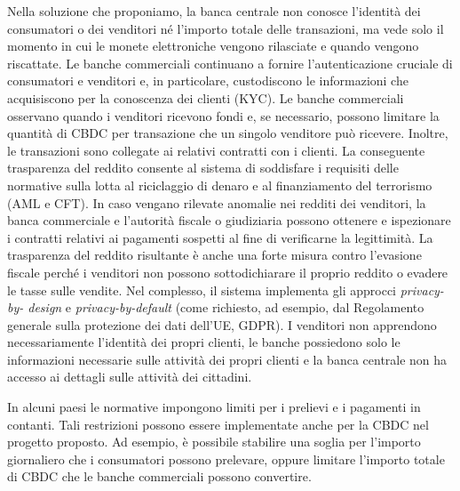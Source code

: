 \documentclass{article}
\begin{document}
Nella soluzione che proponiamo, la banca centrale non conosce
l'identità dei consumatori o dei venditori né l'importo totale delle
transazioni, ma vede solo il momento in cui le monete elettroniche vengono
rilasciate e quando vengono riscattate. Le banche commerciali continuano a
fornire l'autenticazione cruciale di consumatori e venditori e, in particolare,
custodiscono le informazioni che acquisiscono per la conoscenza dei clienti
(KYC). Le banche commerciali osservano quando i venditori ricevono fondi e, se
necessario, possono limitare la quantità di CBDC per transazione che
un singolo venditore può ricevere. Inoltre, le transazioni sono
collegate ai relativi contratti con i clienti. La conseguente
trasparenza del reddito  consente al sistema di soddisfare i requisiti
delle normative sulla lotta al riciclaggio di denaro e al
finanziamento del terrorismo (AML e CFT). In caso vengano rilevate
anomalie nei redditi dei venditori, la banca commerciale e
l'autorità fiscale o giudiziaria possono ottenere e ispezionare i
contratti relativi ai pagamenti sospetti al fine di verificarne la
legittimità. La trasparenza del reddito risultante è anche una forte
misura contro l'evasione fiscale perché i venditori non possono
sottodichiarare il proprio reddito o evadere le tasse sulle vendite.
Nel complesso, il sistema implementa gli approcci \textit{privacy-by-
design} e \textit{privacy-by-default} (come richiesto, ad esempio,
dal Regolamento generale sulla protezione dei dati dell'UE, GDPR). I
venditori non apprendono necessariamente l'identità dei propri clienti,
le banche possiedono solo le informazioni necessarie sulle attività dei
propri clienti e la banca centrale non ha accesso ai dettagli sulle
attività dei cittadini.

In alcuni paesi le normative impongono limiti per i prelievi e i
pagamenti in contanti. Tali restrizioni possono essere implementate
anche per la CBDC nel progetto proposto. Ad esempio, è possibile
stabilire una soglia per l'importo giornaliero che i consumatori possono
prelevare, oppure limitare l'importo totale di CBDC che le banche
commerciali possono convertire.
\end{document}
